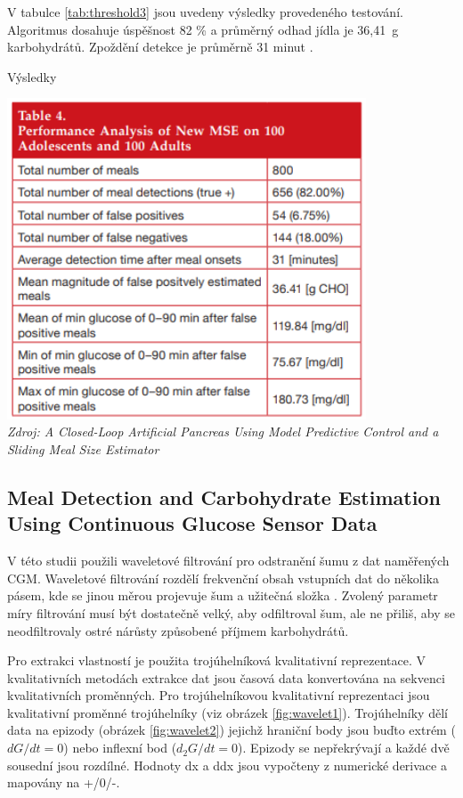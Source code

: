 V tabulce \ref{tab:threshold3} jsou uvedeny výsledky provedeného testování. Algoritmus dosahuje úspěšnost 82 \% a průměrný odhad jídla je 36,41~g karbohydrátů. Zpoždění detekce je průměrně 31 minut \citep{Analyza.Thresholds}.

\begin{table}[H]
\caption{Výsledky}
\label{tab:threshold3}
\centering
\includegraphics[width=0.8\textwidth]{img/analyza/threshold3.png}\\
\textit{Zdroj: A Closed-Loop Artificial Pancreas Using Model Predictive Control and a Sliding Meal Size Estimator \citep{Analyza.Thresholds}}
\end{table}


\subsection{Meal Detection and Carbohydrate Estimation Using Continuous Glucose Sensor Data}
\label{ch:wavelet}

V této studii \citet{Analyza.WaveletEst} použili waveletové filtrování pro odstranění šumu z dat naměřených CGM. Waveletové filtrování rozdělí frekvenční obsah vstupních dat do několika pásem, kde se jinou měrou projevuje šum a užitečná složka \citep{Analyza.Wavelet}. Zvolený parametr míry filtrování musí být dostatečně velký, aby odfiltroval šum, ale ne přiliš, aby se neodfiltrovaly ostré nárůsty způsobené příjmem karbohydrátů.

Pro extrakci vlastností je použita trojúhelníková kvalitativní reprezentace. V kvalitativních metodách extrakce dat jsou časová data konvertována na sekvenci kvalitativních proměnných. Pro trojúhelníkovou kvalitativní reprezentaci jsou kvalitativní proměnné trojúhelníky (viz obrázek \ref{fig:wavelet1}). Trojúhelníky dělí data na epizody (obrázek \ref{fig:wavelet2}) jejichž hraniční body jsou buďto extrém ($dG/dt=0$) nebo inflexní bod ($d_{2}G/dt=0$). Epizody se nepřekrývají a každé dvě sousední jsou rozdílné. Hodnoty dx a ddx jsou vypočteny z numerické derivace a mapovány na +/0/-.

